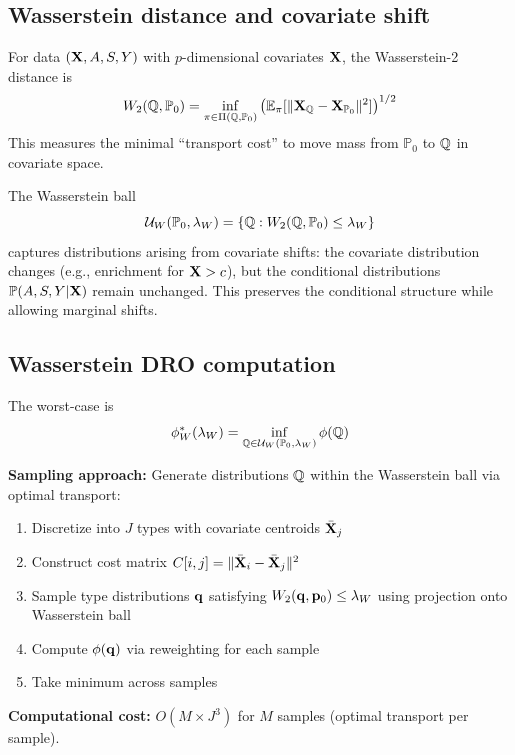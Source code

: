 \documentclass{article}
\newcommand{\PP}{\mathbb{P}}
\begin{document}
\subsection{Wasserstein distance and covariate shift}

For data $(\mathbf{X}, A, S, Y)$ with $p$-dimensional covariates $\mathbf{X}$, the Wasserstein-2 distance is
\begin{equation}
    W_2(\Q, \PP_0) = \inf_{\pi \in \Pi(\Q, \PP_0)} \left( \E_\pi[\|\bX_\Q - \bX_{\PP_0}\|^2] \right)^{1/2}
\end{equation}
This measures the minimal ``transport cost'' to move mass from $\PP_0$ to $\mathbb{Q}$ in covariate space.

The Wasserstein ball
\begin{equation}
    \cU_W(\PP_0, \lambda_W) = \{\Q : W_2(\Q, \PP_0) \leq \lambda_W\}
\end{equation}
captures distributions arising from covariate shifts: the covariate distribution changes (e.g., enrichment for $\mathbf{X} > c$), but the conditional distributions $\PP(A, S, Y | \bX)$ remain unchanged. This preserves the conditional structure while allowing marginal shifts.

\subsection{Wasserstein DRO computation}

The worst-case is
\begin{equation}
    \phi_W^*(\lambda_W) = \inf_{\Q \in \cU_W(\PP_0, \lambda_W)} \phi(\Q)
\end{equation}

\textbf{Sampling approach:} Generate distributions $\mathbb{Q}$ within the Wasserstein ball via optimal transport:
\begin{enumerate}
    \item Discretize into $J$ types with covariate centroids $\bar{\mathbf{X}}_j$
    \item Construct cost matrix $C[i,j] = \|\bar{\mathbf{X}}_i - \bar{\mathbf{X}}_j\|^2$
    \item Sample type distributions $\mathbf{q}$ satisfying $W_2(\mathbf{q}, \mathbf{p}_0) \leq \lambda_W$ using projection onto Wasserstein ball
    \item Compute $\phi(\mathbf{q})$ via reweighting for each sample
    \item Take minimum across samples
\end{enumerate}

\textbf{Computational cost:} $O(M \times J^3)$ for $M$ samples (optimal transport per sample).
\end{document}
